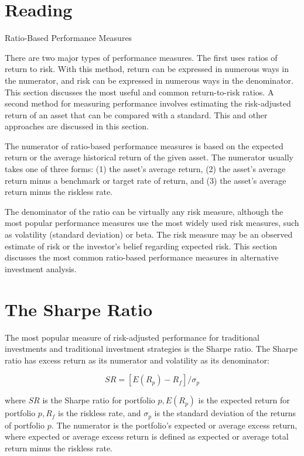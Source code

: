 \documentclass[11pt]{article}
\begin{document}
\section*{Reading}
Ratio-Based Performance Measures

There are two major types of performance measures. The first uses ratios of return to risk. With this method, return can be expressed in numerous ways in the numerator, and risk can be expressed in numerous ways in the denominator. This section discusses the most useful and common return-to-risk ratios. A second method for measuring performance involves estimating the risk-adjusted return of an asset that can be compared with a standard. This and other approaches are discussed in this section.

The numerator of ratio-based performance measures is based on the expected return or the average historical return of the given asset. The numerator usually takes one of three forms: (1) the asset's average return, (2) the asset's average return minus a benchmark or target rate of return, and (3) the asset's average return minus the riskless rate.

The denominator of the ratio can be virtually any risk measure, although the most popular performance measures use the most widely used risk measures, such as volatility (standard deviation) or beta. The risk measure may be an observed estimate of risk or the investor's belief regarding expected risk. This section discusses the most common ratio-based performance measures in alternative investment analysis.

\section*{The Sharpe Ratio}
The most popular measure of risk-adjusted performance for traditional investments and traditional investment strategies is the Sharpe ratio. The Sharpe ratio has excess return as its numerator and volatility as its denominator:


\begin{equation*}
S R=\left[E\left(R_{p}\right)-R_{f}\right] / \sigma_{p} \tag{1}
\end{equation*}


where $S R$ is the Sharpe ratio for portfolio $p, E\left(R_{p}\right)$ is the expected return for portfolio $p, R_{f}$ is the riskless rate, and $\sigma_{p}$ is the standard deviation of the returns of portfolio $p$. The numerator is the portfolio's expected or average excess return, where expected or average excess return is defined as expected or average total return minus the riskless rate.
\end{document}
